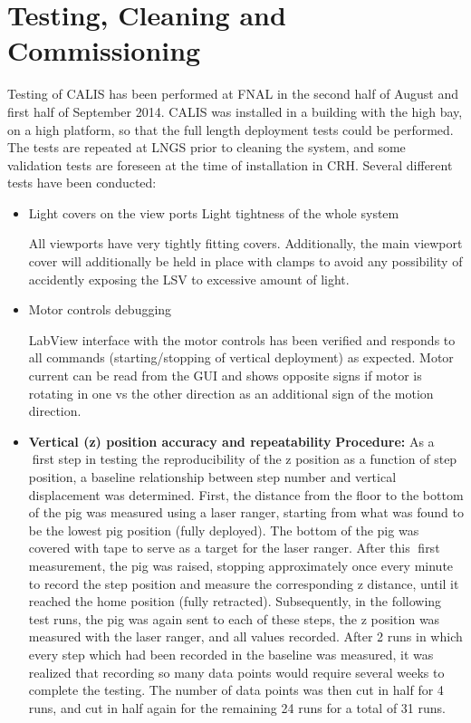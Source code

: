 \section{Testing, Cleaning and Commissioning} \label{sec:Testing}\label{sec:Commissioning}
Testing of CALIS has been performed at FNAL in the second half of August and first half of September 2014. CALIS was installed in a building with the high bay, on a high platform, so that the full length deployment tests could be performed. The tests are repeated at LNGS prior to cleaning the system, and some validation tests are foreseen at the time of installation in CRH.  Several different tests have been conducted:
\begin{itemize}


\item{Light covers on the view ports}
Light tightness of the whole system

All viewports have  very tightly fitting covers. Additionally, the main viewport cover will additionally be held in place with clamps to avoid any possibility of accidently exposing the LSV to excessive amount of light. 



 \item{Motor controls debugging}

    LabView interface with the motor controls has been verified and responds to all commands (starting/stopping of vertical deployment) as expected.  Motor current can be read from the GUI and shows opposite signs if motor is rotating in one vs the other direction as an additional sign of the  motion direction.

\item{\bf Vertical (z) position accuracy and repeatability}
{\bf Procedure:} As a first step in testing the reproducibility of the z position as a function of step position,
a baseline relationship between step number and vertical displacement was determined. First, the distance
from the floor to the bottom of the pig was measured using a laser ranger, starting from what was found
to be the lowest pig position (fully deployed). The bottom of the pig was covered with tape to serve as a
target for the laser ranger. After this first measurement, the pig was raised, stopping approximately once
every minute to record the step position and measure the corresponding z distance, until it reached the home position (fully retracted). Subsequently, in the following test runs, the pig was again sent to each of these steps, the z position was measured with the laser ranger, and all values recorded. After 2 runs in which every step which had been recorded in the baseline was measured, it was realized that recording so many data points would require several weeks to complete the testing. The number of data points was then cut in half for 4 runs, and cut in half again for the remaining 24 runs for a total of 31 runs.


\end{itemize}

